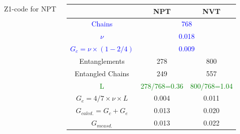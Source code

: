 \documentclass[12pt, dvipdfmx]{beamer}
\begin{document}
\begin{frame}
\begin{columns}[c, onlytextwidth]
\begin{center}
					\scriptsize
					Z1-code for NPT
				\end{center}
				\scriptsize
				\begin{center}
					\begin{tabular}{c|c|c} \hline
						&NPT & NVT \\ \hline \hline
						\textcolor{blue}{Chains} & \multicolumn{2}{|c}{\textcolor{blue}{768}}\\ \hline
						\textcolor{blue}{$\nu$}& \multicolumn{2}{|c}{\textcolor{blue}{0.018}}\\ \hline
						\textcolor{blue}{$G_c = \nu \times (1-2/4)$}&\multicolumn{2}{|c}{\textcolor{blue}{0.009}} \\ \hline \hline
						Entanglements& 278& 800\\ \hline
						Entangled Chains&249&557 \\ \hline
						\textcolor{green}{L} & \textcolor{green}{278/768=0.36} & \textcolor{green}{800/768=1.04} \\ \hline
						$G_e=4/7 \times \nu \times L $ & 0.004 & 0.011 \\ \hline \hline
						\alert{$G_{calcd.}=G_c + G_e$} & \alert{0.013} & \alert{0.020} \\ \hline \hline
						$G_{measd.}$ & 0.013 & 0.022 \\ \hline
					\end{tabular}
				\end{center}
		\end{columns}
\end{frame}
\end{document}
